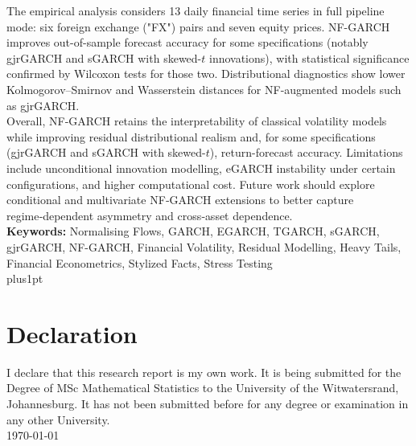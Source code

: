 \documentclass[oneside,12pt]{CUEDthesisPSnPDF}
\begin{document}
The empirical analysis considers 13 daily financial time series in full pipeline mode: six foreign exchange ("FX") pairs and seven equity prices. NF-GARCH improves out-of-sample forecast accuracy for some specifications (notably gjrGARCH and sGARCH with skewed-$t$ innovations), with statistical significance confirmed by Wilcoxon tests for those two. Distributional diagnostics show lower Kolmogorov--Smirnov and Wasserstein distances for NF-augmented models such as gjrGARCH.\\

Overall, NF‑GARCH retains the interpretability of classical volatility models while improving residual distributional realism and, for some specifications (gjrGARCH and sGARCH with skewed-$t$), return-forecast accuracy. Limitations include unconditional innovation modelling, eGARCH instability under certain configurations, and higher computational cost. Future work should explore conditional and multivariate NF‑GARCH extensions to better capture regime‑dependent asymmetry and cross‑asset dependence.\\


\textbf{Keywords:} Normalising Flows, GARCH, EGARCH, TGARCH, sGARCH, gjrGARCH, NF-GARCH, Financial Volatility, Residual Modelling, Heavy Tails, Financial Econometrics, Stylized Facts, Stress Testing\\


\renewcommand\baselinestretch{1.5}
\baselineskip=18pt plus1pt
\setcounter{secnumdepth}{4}
\setcounter{tocdepth}{3}
\frontmatter
{}
\tableofcontents

\mainmatter
{}


\noindent 
\chapter*{Declaration}

\noindent I declare that this research report is my own work.  It is being submitted for the Degree of MSc Mathematical Statistics to the University of the Witwatersrand, Johannesburg.  It has not been submitted before for any degree or examination in any other University.\\  

\noindent \today
\clearpage
\noindent \eject 
\noindent 
\end{document}
